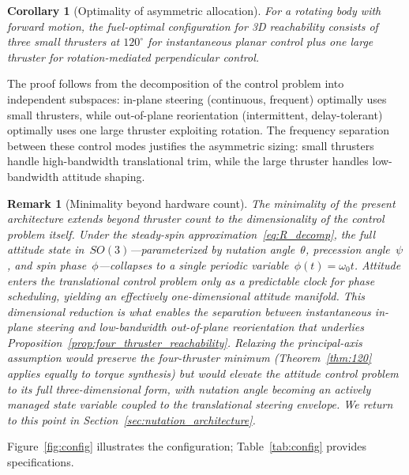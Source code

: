 \documentclass{article}
\newtheorem{corollary}{Corollary}
\newtheorem{remark}{Remark}
\begin{document}
\begin{corollary}[Optimality of asymmetric allocation]
\label{cor:asymmetric}
For a rotating body with forward motion, the fuel-optimal configuration for 3D reachability consists of three small thrusters at $120^\circ$ for instantaneous planar control plus one large thruster for rotation-mediated perpendicular control.
\end{corollary}

The proof follows from the decomposition of the control problem into independent subspaces: in-plane steering (continuous, frequent) optimally uses small thrusters, while out-of-plane reorientation (intermittent, delay-tolerant) optimally uses one large thruster exploiting rotation. The frequency separation between these control modes justifies the asymmetric sizing: small thrusters handle high-bandwidth translational trim, while the large thruster handles low-bandwidth attitude shaping.

\begin{remark}[Minimality beyond hardware count]
\label{rem:dimensionality}
The minimality of the present architecture extends beyond thruster count to the dimensionality
of the control problem itself. Under the steady-spin
approximation~\eqref{eq:R_decomp}, the full attitude state in~$SO(3)$---parameterized by
nutation angle~$\theta$, precession angle~$\psi$, and spin phase~$\phi$---collapses to a
single periodic variable~$\phi(t)=\omega_0 t$. Attitude enters the translational control
problem only as a predictable clock for phase scheduling, yielding an effectively
one-dimensional attitude manifold. This dimensional reduction is what enables the separation
between instantaneous in-plane steering and low-bandwidth out-of-plane reorientation that
underlies Proposition~\ref{prop:four_thruster_reachability}. Relaxing the principal-axis
assumption would preserve the four-thruster minimum (Theorem~\ref{thm:120} applies equally
to torque synthesis) but would elevate the attitude control problem to its full
three-dimensional form, with nutation angle becoming an actively managed state variable
coupled to the translational steering envelope. We return to this point in
Section~\ref{sec:nutation_architecture}.
\end{remark}

Figure~\ref{fig:config} illustrates the configuration; Table~\ref{tab:config} provides specifications.
\end{document}
